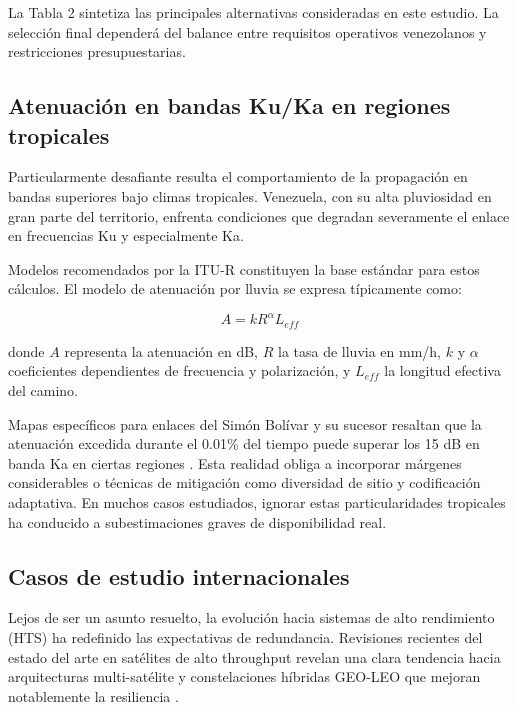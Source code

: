 La Tabla 2 sintetiza las principales alternativas consideradas en este estudio. La selección final dependerá del balance entre requisitos operativos venezolanos y restricciones presupuestarias.

\subsection{Atenuación en bandas Ku/Ka en regiones tropicales}

Particularmente desafiante resulta el comportamiento de la propagación en bandas superiores bajo climas tropicales. Venezuela, con su alta pluviosidad en gran parte del territorio, enfrenta condiciones que degradan severamente el enlace en frecuencias Ku y especialmente Ka.

Modelos recomendados por la ITU-R constituyen la base estándar para estos cálculos. El modelo de atenuación por lluvia se expresa típicamente como:

\begin{equation}
A = k R^{\alpha} L_{eff}
\label{eq:itu_rain}
\end{equation}

donde \(A\) representa la atenuación en dB, \(R\) la tasa de lluvia en mm/h, \(k\) y \(\alpha\) coeficientes dependientes de frecuencia y polarización, y \(L_{eff}\) la longitud efectiva del camino. 

Mapas específicos para enlaces del Simón Bolívar y su sucesor resaltan que la atenuación excedida durante el 0.01\% del tiempo puede superar los 15 dB en banda Ka en ciertas regiones \cite{RainAttenVenezuela2023}. Esta realidad obliga a incorporar márgenes considerables o técnicas de mitigación como diversidad de sitio y codificación adaptativa. En muchos casos estudiados, ignorar estas particularidades tropicales ha conducido a subestimaciones graves de disponibilidad real.

\subsection{Casos de estudio internacionales}

Lejos de ser un asunto resuelto, la evolución hacia sistemas de alto rendimiento (HTS) ha redefinido las expectativas de redundancia. Revisiones recientes del estado del arte en satélites de alto throughput revelan una clara tendencia hacia arquitecturas multi-satélite y constelaciones híbridas GEO-LEO que mejoran notablemente la resiliencia \cite{HTSSurvey2025}.

